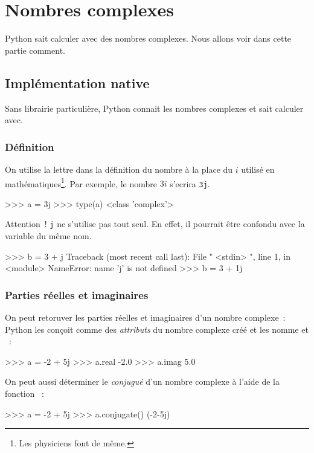 
\chapter{Nombres complexes}

Python sait calculer avec des nombres complexes. Nous allons voir dans cette partie comment.

\section{Implémentation native}\label{python:complexes:natif}

Sans librairie particulière, Python connait les nombres complexes et sait calculer avec.

\subsection{Définition}
On utilise la lettre  dans la définition du nombre à la place du $i$ utilisé
en mathématiques\footnote{Les physiciens font de même.}. Par exemple, le nombre $3i$ s'ecrira
\texttt{3j}.

\begin{pythoncode}
>>> a = 3j
>>> type(a)
<class 'complex'>
\end{pythoncode}

\begin{remarque}
Attention~! \texttt{j} ne s'utilise pas tout seul. En effet, il pourrait être confondu avec
la variable du même nom.
\begin{pythoncode}
>>> b = 3 + j
Traceback (most recent call last):
  File " <stdin> ", line 1, in <module>
NameError: name 'j' is not defined
>>> b = 3 + 1j
\end{pythoncode}
\end{remarque}


\subsection{Parties réelles et imaginaires}
On peut retoruver les parties réelles  et imaginaires
 d'un nombre
complexe~: Python les conçoit comme
des \textit{attributs} du nombre complexe créé et les nomme  et ~:
\begin{pythoncode}
>>> a = -2 + 5j
>>> a.real
-2.0
>>> a.imag
5.0
\end{pythoncode}
On peut aussi déterminer le \textit{conjugué} d'un nombre complexe à l'aide
de la fonction ~:
\begin{pythoncode}
>>> a = -2 + 5j
>>> a.conjugate()
(-2-5j)
\end{pythoncode}

